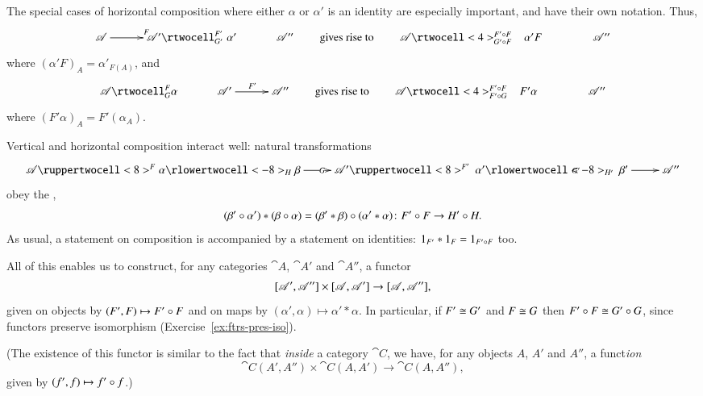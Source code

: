 \begin{remarks}
The special%
% 
\label{p:special-cases}
%
cases of horizontal composition where either $\alpha$ or $\alpha'$ is an
identity are especially important, and have their own notation.  Thus,
\[
\xymatrix@C+.5em{
\cat{A}
\ar[r]^F        &
\cat{A}'
\rtwocell^{F'}_{G'}{\hspace{.3em}\alpha'}    &
\cat{A}''
}
\qquad
\text{gives rise to}
\qquad
\xymatrix@C+1.5em{
\cat{A} \rtwocell<4>^{F'\of F}_{G'\of F}{\hspace{.8em}\alpha' F}      &\cat{A}''
}%
%
\ntn{whisker-right}
%
\]
where $(\alpha' F)_A = \alpha'_{F(A)}$, and 
\[
\xymatrix@C+.5em{
\cat{A}
\rtwocell^F_G{\alpha}   &
\cat{A}'
\ar[r]^{F'}     &
\cat{A}''
}
\qquad
\text{gives rise to}
\qquad
\xymatrix@C+1.5em{
\cat{A} \rtwocell<4>^{F'\of F}_{F' \of G}{\hspace{.8em}F' \alpha} &
\cat{A}''
}%
%
\ntn{whisker-left}
%
\]
where $(F'\alpha)_A = F'(\alpha_A)$.  

Vertical and horizontal composition interact well: natural transformations
\[
\xymatrix{
\cat{A} 
\ruppertwocell<8>^F{\alpha}
\ar[r]|G
\rlowertwocell<-8>_H{\beta} &
\cat{A}'
\ruppertwocell<8>^{F'}{\hspace{.2em}\alpha'}
\ar[r]|{G'}
\rlowertwocell<-8>_{H'}{\hspace{.2em}\beta'} &
\cat{A}''
}
\]
obey the ,%
%
%
\[
(\beta' \of \alpha') * (\beta \of \alpha)
=
(\beta' * \beta) \of (\alpha' * \alpha)
\from
F' \of F \to H' \of H.
\]
As usual, a statement on composition is accompanied by a statement on
identities: $1_{F'} * 1_F = 1_{F' \mathbin{\circ} F}$ too.

All of this enables us to construct, for any categories $\cat{A}$,
$\cat{A}'$ and $\cat{A}''$, a functor
\[
\ftrcat{\cat{A}'}{\cat{A}''}
\times
\ftrcat{\cat{A}}{\cat{A}'}
\to
\ftrcat{\cat{A}}{\cat{A}''},
%
\index{functor!category}
%
\]
given on objects by $(F', F) \mapsto F' \mathbin{\circ} F$ and on maps by $(\alpha',
\alpha) \mapsto \alpha' * \alpha$.  In particular, if $F' \cong G'$ and $F
\cong G$ then $F' \mathbin{\circ} F \cong G' \mathbin{\circ} G$, since functors preserve isomorphism
(Exercise~\ref{ex:ftrs-pres-iso}).

(The existence of this functor is similar to the fact that \emph{inside} a
category $\cat{C}$, we have, for any objects $A$, $A'$ and $A''$, a
funct\emph{ion}
\[
\cat{C}(A', A'') \times \cat{C}(A, A') \to \cat{C}(A, A''),
\]
given by $(f', f) \mapsto f' \mathbin{\circ} f$.)


\end{remarks}
